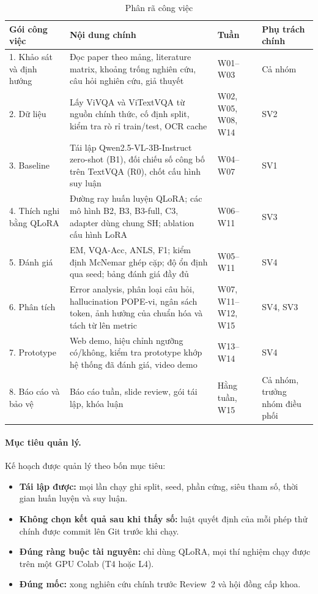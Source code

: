 \begin{table}[htbp]
\caption{Phân rã công việc}
\label{tab:pm-wbs}
\centering
\small
\begin{tabular}{p{}p{}p{}p{}}
\toprule
\textbf{Gói công việc} & \textbf{Nội dung chính} & \textbf{Tuần} & \textbf{Phụ trách chính} \\
\midrule
1. Khảo sát và định hướng & Đọc paper theo mảng, literature matrix, khoảng trống nghiên cứu, câu hỏi nghiên cứu, giả thuyết & W01--W03 & Cả nhóm \\
2. Dữ liệu & Lấy ViVQA và ViTextVQA từ nguồn chính thức, cố định split, kiểm tra rò rỉ train/test, OCR cache & W02, W05, W08, W14 & SV2 \\
3. Baseline & Tái lập Qwen2.5-VL-3B-Instruct zero-shot (B1), đối chiếu số công bố trên TextVQA (R0), chốt cấu hình suy luận & W04--W07 & SV1 \\
4. Thích nghi bằng QLoRA & Đường ray huấn luyện QLoRA; các mô hình B2, B3, B3-full, C3, adapter dùng chung SH; ablation cấu hình LoRA & W06--W11 & SV3 \\
5. Đánh giá & EM, VQA-Acc, ANLS, F1; kiểm định McNemar ghép cặp; độ ổn định qua seed; bảng đánh giá đầy đủ & W05--W11 & SV4 \\
6. Phân tích & Error analysis, phân loại câu hỏi, hallucination POPE-vi, ngân sách token, ảnh hưởng của chuẩn hóa và tách từ lên metric & W07, W11--W12, W15 & SV4, SV3 \\
7. Prototype & Web demo, hiệu chỉnh ngưỡng có/không, kiểm tra prototype khớp hệ thống đã đánh giá, video demo & W13--W14 & SV4 \\
8. Báo cáo và bảo vệ & Báo cáo tuần, slide review, gói tái lập, khóa luận & Hằng tuần, W15 & Cả nhóm, trưởng nhóm điều phối \\
\bottomrule
\end{tabular}
\end{table}

\paragraph{Mục tiêu quản lý.} Kế hoạch được quản lý theo bốn mục tiêu:

\begin{itemize}
  \item \textbf{Tái lập được:} mọi lần chạy ghi split, seed, phần cứng, siêu
  tham số, thời gian huấn luyện và suy luận.
  \item \textbf{Không chọn kết quả sau khi thấy số:} luật quyết định của mỗi
  phép thử chính được commit lên Git trước khi chạy.
  \item \textbf{Đúng ràng buộc tài nguyên:} chỉ dùng QLoRA, mọi thí nghiệm chạy
  được trên một GPU Colab (T4 hoặc L4).
  \item \textbf{Đúng mốc:} xong nghiên cứu chính trước Review~2 và hội đồng cấp
  khoa.
\end{itemize}

